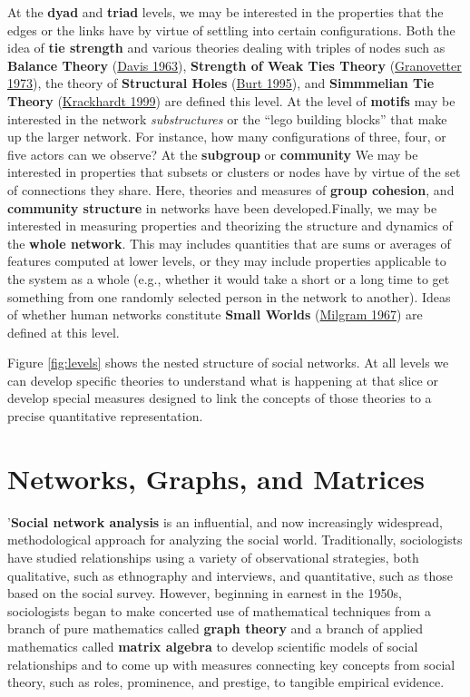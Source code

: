 \documentclass[]{tufte-book}
\begin{document}
At the \textbf{dyad} and \textbf{triad} levels, we may be interested in the properties that the edges or the links have by virtue of settling into certain configurations. Both the idea of \textbf{tie strength} and various theories dealing with triples of nodes such as \textbf{Balance Theory} (\protect\hyperlink{ref-davis63}{Davis 1963}), \textbf{Strength of Weak Ties Theory} (\protect\hyperlink{ref-granovetter73}{Granovetter 1973}), the theory of \textbf{Structural Holes} (\protect\hyperlink{ref-burt95}{Burt 1995}), and \textbf{Simmmelian Tie Theory} (\protect\hyperlink{ref-krackhardt99}{Krackhardt 1999}) are defined this level. At the level of \textbf{motifs} may be interested in the network \emph{substructures} or the ``lego building blocks'' that make up the larger network. For instance, how many configurations of three, four, or five actors can we observe? At the \textbf{subgroup} or \textbf{community} We may be interested in properties that subsets or clusters or nodes have by virtue of the set of connections they share. Here, theories and measures of \textbf{group cohesion}, and \textbf{community structure} in networks have been developed.Finally, we may be interested in measuring properties and theorizing the structure and dynamics of the \textbf{whole network}. This may includes quantities that are sums or averages of features computed at lower levels, or they may include properties applicable to the system as a whole (e.g., whether it would take a short or a long time to get something from one randomly selected person in the network to another). Ideas of whether human networks constitute \textbf{Small Worlds} (\protect\hyperlink{ref-milgram67}{Milgram 1967}) are defined at this level.

Figure \ref{fig:levels} shows the nested structure of social networks. At all levels we can develop specific theories to understand what is happening at that slice or develop special measures designed to link the concepts of those theories to a precise quantitative representation.

\hypertarget{networks-graphs-and-matrices}{%
\section{Networks, Graphs, and Matrices}\label{networks-graphs-and-matrices}}

'\textbf{Social network analysis} is an influential, and now increasingly widespread, methodological approach for analyzing the social world. Traditionally, sociologists have studied relationships using a variety of observational strategies, both qualitative, such as ethnography and interviews, and quantitative, such as those based on the social survey. However, beginning in earnest in the 1950s, sociologists began to make concerted use of mathematical techniques from a branch of pure mathematics called \textbf{graph theory} and a branch of applied mathematics called \textbf{matrix algebra} to develop scientific models of social relationships and to come up with measures connecting key concepts from social theory, such as roles, prominence, and prestige, to tangible empirical evidence.
\end{document}
